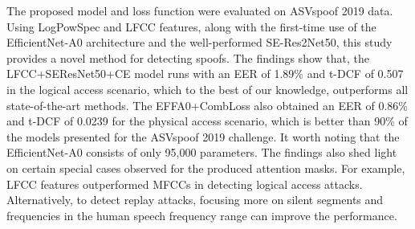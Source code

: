 \documentclass[a4paper]{article}
\begin{document}
The proposed model and loss function were evaluated on ASVspoof 2019 data. Using LogPowSpec and LFCC features, along with the first-time use of the EfficientNet-A0 architecture and the well-performed SE-Res2Net50, this study provides a novel method for detecting spoofs. The findings show that, the LFCC+SEResNet50+CE model runs with an EER of 1.89\% and t-DCF of 0.507 in the logical access scenario, which to the best of our knowledge, outperforms all state-of-the-art methods. The EFFA0+CombLoss also obtained an EER of 0.86\% and t-DCF of 0.0239 for the physical access scenario, which is better than 90\% of the models presented for the ASVspoof 2019 challenge. It worth noting that the EfficientNet-A0 consists of only 95,000 parameters. The findings also shed light on certain special cases observed for the produced attention masks. For example, LFCC features outperformed MFCCs in detecting logical access attacks. Alternatively, to detect replay attacks, focusing more on silent segments and frequencies in the human speech frequency range can improve the performance.




\end{document}
